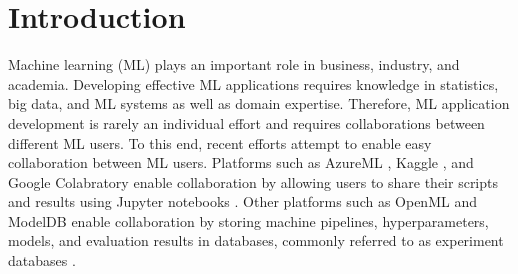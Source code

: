 \section{Introduction} \label{sec-introduction}
Machine learning (ML) plays an important role in business, industry, and academia. 
Developing effective ML applications requires knowledge in statistics, big data, and ML systems as well as domain expertise.
Therefore, ML application development is rarely an individual effort and requires collaborations between different ML users.
To this end, recent efforts attempt to enable easy collaboration between ML users.
Platforms such as AzureML \cite{team2016azureml}, Kaggle \cite{kagglewebsite}, and Google Colabratory \cite{googlecolab} enable collaboration by allowing users to share their scripts and results using Jupyter notebooks \cite{Kluyver:2016aa}.
Other platforms such as OpenML \cite{vanschoren2014openml} and ModelDB \cite{vartak2016m} enable collaboration by storing machine pipelines, hyperparameters, models, and evaluation results in databases, commonly referred to as experiment databases \cite{Vanschoren2012}.


